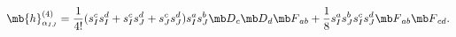 \begin{equation}
{\mb{h}}_{\alpha_{IJ}}^{(4)}=\frac{1}{4!}(s^{c}_Is^{d}_I+s_{I}^{c}s^{d}_{J}+s_{J}^{c}s^{d}_{J})s_{I}^{a}s^{b}_{J}{\mb D}_{c}{\mb D}_{d}{\mb F}_{ab}
+\frac{1}{8}s_{I}^{a}s_{J}^{b}s_{I}^{c}s_{J}^{d}{\mb F}_{ab}{\mb F}_{cd}.
\label{4ORDHOL}
\end{equation}

